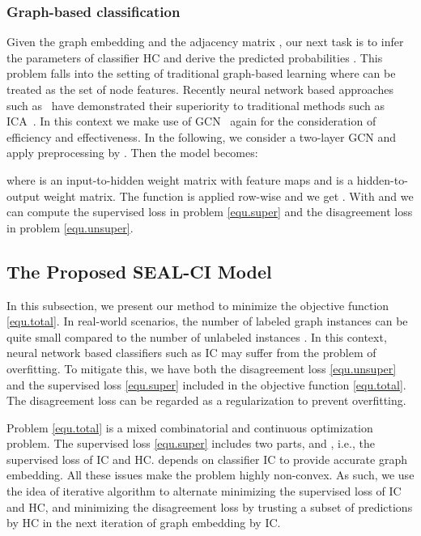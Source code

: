 \documentclass[sigconf]{acmart}
\newcommand{\eat}[1]{}
\begin{document}
\subsubsection{Graph-based classification}\label{ssc}
Given the graph embedding  and the adjacency matrix , our next task is to infer the parameters of classifier HC and derive the predicted probabilities . \eat{It is done by solving problem \eqref{equ.super} while holding  constant.} This problem falls into the setting of traditional graph-based learning where  can be treated as the set of node features.  Recently neural network based approaches such as~\cite{kipf2017semi,yang2016revisiting} have demonstrated their superiority to traditional methods such as ICA~\cite{sen2008collective}.  In this context we make use of GCN~\cite{kipf2017semi} again for the consideration of efficiency and effectiveness. In the following, we consider a two-layer GCN and apply preprocessing by . Then the model becomes:

where  is an input-to-hidden weight matrix with  feature maps and  is a hidden-to-output weight matrix. The  function is applied row-wise and we get .  With  and  we can compute the supervised loss in problem \eqref{equ.super} and the disagreement loss in problem \eqref{equ.unsuper}.



\subsection{The Proposed SEAL-CI Model}\label{sec.method}
In this subsection, we present our method to minimize the objective function \eqref{equ.total}.  In real-world scenarios, the number of labeled graph instances  can be quite small compared to the number of unlabeled instances .  In this context, neural network based classifiers such as IC may suffer from the problem of overfitting.  To mitigate this, we have both the disagreement loss \eqref{equ.unsuper} and the supervised loss \eqref{equ.super} included in the objective function \eqref{equ.total}.  The disagreement loss can be regarded as a regularization to prevent overfitting.

Problem \eqref{equ.total} is a mixed combinatorial and continuous optimization problem.  The supervised loss \eqref{equ.super} includes two parts,  and , i.e., the supervised loss of IC and HC.   depends on classifier IC to provide accurate graph embedding.  All these issues make the problem highly non-convex.  As such, we use the idea of iterative algorithm to alternate minimizing the supervised loss of IC and HC, and minimizing the disagreement loss by trusting a subset of predictions by HC in the next iteration of graph embedding by IC.
\end{document}
